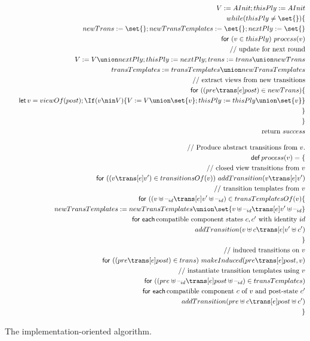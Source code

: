 \begin{figure}
\[
\begin{align}
V := AInit; thisPly := AInit \\
while(thisPly \ne \set{})\{ \\
\quad newTrans := \set{}; newTransTemplates := \set{}; nextPly := \set{} \\
\quad \For(v \in thisPly)\ process(v) \\
\quad \comment{update for next round} \\
\quad V := V \union nextPly; thisPly := nextPly; trans := trans \union newTrans \\
\quad  transTemplates := transTemplates \union newTransTemplates \\
\quad \comment{extract views from new transitions} \\
\quad \For ((pre \trans[e] post) \in newTrans)\{ \\
\qquad \Let v = viewOf(post); 
  \If(v \nin V)\{ V := V \union \set{v}; thisPly := thisPly \union \set{v} \}\\
\quad \}\\
\} \\
\mbox{return $success$}
\\[2ex]
\comment{Produce abstract transitions from $v$.} \\
\Def process(v) = \{ \\ %
\quad \comment{closed view transitions from~$v$} \\
\quad \For ((v \trans[e] v') \in transitionsOf(v)) \
   addTransition(v \trans[e] v') \\
\quad \comment{transition templates from $v$} \\
\quad \For ((v \uplus \hole{id}  \trans[e] v' \uplus \hole{id}) 
  \in transTemplatesOf(v) \{ \\
\qquad  newTransTemplates := newTransTemplates \union
   \set{v \uplus \hole{id}  \trans[e] v' \uplus \hole{id}} \\
\qquad \Foreach \mbox{compatible component states~$c, c'$ with identity~$id$} \\
\qquad\quad           addTransition(v \uplus c \trans[e] v' \uplus c') \\
\quad \} \\
\quad \comment{induced transitions on~$v$} \\
\quad \For ((pre \trans[e] post) \in trans)\ 
  makeInduced(pre \trans[e] post,v) \\
\quad \comment{instantiate transition templates using $v$} \\
\quad \For ((pre \uplus \hole{id} \trans[e] post \uplus \hole{id})
   \in transTemplates) \\
\qquad  \Foreach \mbox{compatible component $c$ of $v$ and post-state~$c'$} \\
\qquad\quad addTransition(pre \uplus c \trans[e] post \uplus c') \\
\} %
\end{align}
\]
\caption{The implementation-oriented algorithm.}
\label{fig:algorithm-2}
\end{figure}

